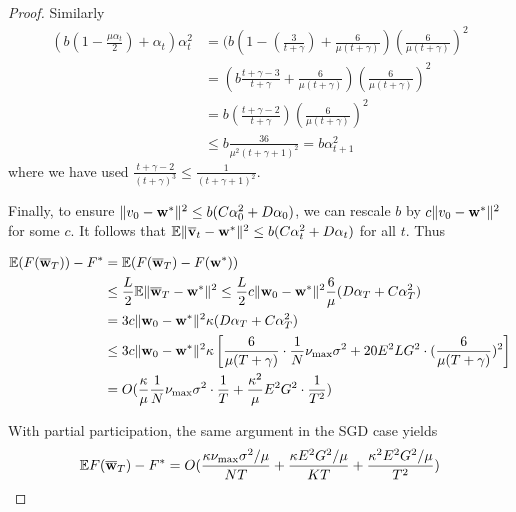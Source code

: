 \begin{proof}
Similarly 
\begin{align*}
(b(1-\frac{\mu\alpha_{t}}{2})+\alpha_{t})\alpha_{t}^{2} & =(b(1-(\frac{3}{t+\gamma})+\frac{6}{\mu(t+\gamma)})(\frac{6}{\mu(t+\gamma)})^{2}\\
& =(b\frac{t+\gamma-3}{t+\gamma}+\frac{6}{\mu(t+\gamma)})(\frac{6}{\mu(t+\gamma)})^{2}\\
& =b(\frac{t+\gamma-2}{t+\gamma})(\frac{6}{\mu(t+\gamma)})^{2}\\
& \leq b\frac{36}{\mu^{2}(t+\gamma+1)^{2}}=b\alpha_{t+1}^{2}
\end{align*}
where we have used $\frac{t+\gamma-2}{(t+\gamma)^{3}}\leq\frac{1}{(t+\gamma+1)^{2}}$.

Finally, to ensure $\|v_{0}-{\mathbf{w}}^{\ast}\|^{2}\leq b(C\alpha_{0}^{2}+D\alpha_{0})$,
we can rescale $b$ by $c\|v_{0}-{\mathbf{w}}^{\ast}\|^{2}$ for some $c.$ It
follows that $\mathbb{E}\|{\overline{\mathbf{v}}}_{t}-{\mathbf{w}}^{\ast}\|^{2}\leq b(C\alpha_{t}^{2}+D\alpha_{t})$
for all $t$. Thus 

\begin{align*}
\mathbb{E}(F({\overline{\mathbf{w}}}_{T}))-F^{\ast} & =\mathbb{E}(F({\overline{\mathbf{w}}}_{T})-F({\mathbf{w}}^{\ast}))\\
& \leq\frac{L}{2}\mathbb{E}\|{\overline{\mathbf{w}}}_{T}-{\mathbf{w}}^{\ast}\|^{2}\leq\frac{L}{2}c\|{\mathbf{w}}_{0}-{\mathbf{w}}^{\ast}\|^{2}\frac{6}{\mu}(D\alpha_{T}+C\alpha_{T}^{2})\\
& =3c\|{\mathbf{w}}_{0}-{\mathbf{w}}^{\ast}\|^{2}\kappa(D\alpha_{T}+C\alpha_{T}^{2})\\
& \leq3c\|{\mathbf{w}}_{0}-{\mathbf{w}}^{\ast}\|^{2}\kappa\left[\frac{6}{\mu(T+\gamma)}\cdot\frac{1}{N}\nu_{\max}\sigma^{2}+20E^{2}LG^{2}\cdot(\frac{6}{\mu(T+\gamma)})^{2}\right]\\
& =O(\frac{\kappa}{\mu}\frac{1}{N}\nu_{\max}\sigma^{2}\cdot\frac{1}{T}+\frac{\kappa^{2}}{\mu}E^{2}G^{2}\cdot\frac{1}{T^{2}})
\end{align*}

With partial participation, the same argument in the SGD case yields
\begin{align*}
\mathbb{E}F({\overline{\mathbf{w}}}_{T})-F^{\ast}=O(\frac{\kappa\nu_{\max}\sigma^{2}/\mu}{NT}+\frac{\kappa E^{2}G^{2}/\mu}{KT}+\frac{\kappa^{2}E^{2}G^{2}/\mu}{T^{2}})
\end{align*}
\end{proof}